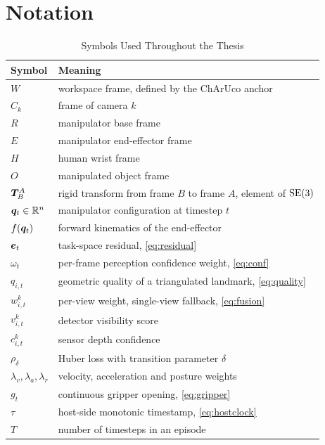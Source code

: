 \appendix
\chapter{Notation}
\label{app:notation}

\begin{table}[htbp]
\caption{Symbols Used Throughout the Thesis}
\label{tab:notation}
\centering
\small
\begin{tabular}{ll}
\toprule
Symbol & Meaning \\
\midrule
$W$ & workspace frame, defined by the ChArUco anchor \\
$C_k$ & frame of camera $k$ \\
$R$ & manipulator base frame \\
$E$ & manipulator end-effector frame \\
$H$ & human wrist frame \\
$O$ & manipulated object frame \\
$\bm{T}^{A}_{B}$ & rigid transform from frame $B$ to frame $A$, element of $\mathrm{SE}(3)$ \\
$\bm{q}_t \in \mathbb{R}^{n}$ & manipulator configuration at timestep $t$ \\
$f(\bm{q}_t)$ & forward kinematics of the end-effector \\
$\bm{e}_t$ & task-space residual, \eqref{eq:residual} \\
$\omega_t$ & per-frame perception confidence weight, \eqref{eq:conf} \\
$q_{i,t}$ & geometric quality of a triangulated landmark, \eqref{eq:quality} \\
$w^{k}_{i,t}$ & per-view weight, single-view fallback, \eqref{eq:fusion} \\
$v^{k}_{i,t}$ & detector visibility score \\
$c^{k}_{i,t}$ & sensor depth confidence \\
$\rho_\delta$ & Huber loss with transition parameter $\delta$ \\
$\lambda_v,\lambda_a,\lambda_r$ & velocity, acceleration and posture weights \\
$g_t$ & continuous gripper opening, \eqref{eq:gripper} \\
$\tau$ & host-side monotonic timestamp, \eqref{eq:hostclock} \\
$T$ & number of timesteps in an episode \\
\bottomrule
\end{tabular}
\end{table}

